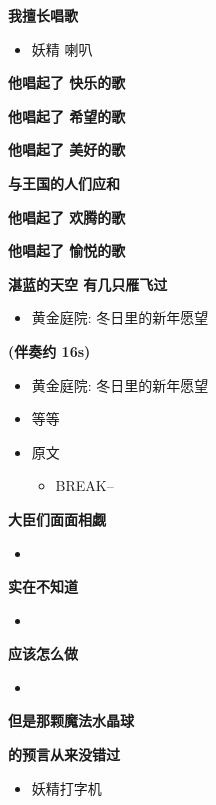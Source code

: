 \documentclass[a4paper]{article}
\begin{document}
\textbf{我擅长唱歌}

\begin{itemize}
    \item 妖精 喇叭
\end{itemize}

\textbf{他唱起了 快乐的歌}

\textbf{他唱起了 希望的歌}

\textbf{他唱起了 美好的歌}

\textbf{与王国的人们应和}

\textbf{他唱起了 欢腾的歌}

\textbf{他唱起了 愉悦的歌}

\textbf{湛蓝的天空 有几只雁飞过}

\begin{itemize}
    \item 黄金庭院: 冬日里的新年愿望
\end{itemize}

\textbf{(伴奏约 16s)}

\begin{itemize}
    \item 黄金庭院: 冬日里的新年愿望
    \item 等等
    \item 原文
    \begin{itemize}
        \item BREAK--
    \end{itemize}
\end{itemize}

\textbf{大臣们面面相觑}

\begin{itemize}
    \item 
\end{itemize}

\textbf{实在不知道}

\begin{itemize}
    \item 
\end{itemize}

\textbf{应该怎么做}

\begin{itemize}
    \item 
\end{itemize}

\textbf{但是那颗魔法水晶球}

\textbf{的预言从来没错过}

\begin{itemize}
    \item 妖精打字机
\end{itemize}
\end{document}
